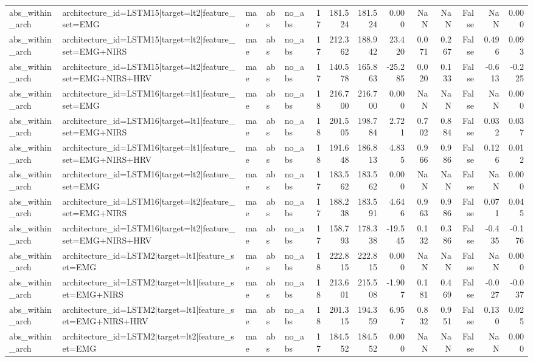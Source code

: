\begin{table}
\begin{tabular}{lllllrrrrrrrrr}
abs_within_arch & architecture_id=LSTM15|target=lt2|feature_set=EMG & mae & abs & no_abs & 17 & 181.524 & 181.524 & 0.000 & NaN & NaN & False & NaN & 0.000 \\
abs_within_arch & architecture_id=LSTM15|target=lt2|feature_set=EMG+NIRS & mae & abs & no_abs & 17 & 212.362 & 188.942 & 23.420 & 0.071 & 0.267 & False & 0.496 & 0.093 \\
abs_within_arch & architecture_id=LSTM15|target=lt2|feature_set=EMG+NIRS+HRV & mae & abs & no_abs & 17 & 140.578 & 165.863 & -25.285 & 0.020 & 0.133 & False & -0.613 & -0.225 \\
abs_within_arch & architecture_id=LSTM16|target=lt1|feature_set=EMG & mae & abs & no_abs & 18 & 216.700 & 216.700 & 0.000 & NaN & NaN & False & NaN & 0.000 \\
abs_within_arch & architecture_id=LSTM16|target=lt1|feature_set=EMG+NIRS & mae & abs & no_abs & 18 & 201.505 & 198.784 & 2.721 & 0.702 & 0.884 & False & 0.032 & 0.037 \\
abs_within_arch & architecture_id=LSTM16|target=lt1|feature_set=EMG+NIRS+HRV & mae & abs & no_abs & 18 & 191.648 & 186.813 & 4.835 & 0.966 & 0.986 & False & 0.126 & 0.012 \\
abs_within_arch & architecture_id=LSTM16|target=lt2|feature_set=EMG & mae & abs & no_abs & 17 & 183.562 & 183.562 & 0.000 & NaN & NaN & False & NaN & 0.000 \\
abs_within_arch & architecture_id=LSTM16|target=lt2|feature_set=EMG+NIRS & mae & abs & no_abs & 17 & 188.238 & 183.591 & 4.646 & 0.963 & 0.986 & False & 0.071 & 0.045 \\
abs_within_arch & architecture_id=LSTM16|target=lt2|feature_set=EMG+NIRS+HRV & mae & abs & no_abs & 17 & 158.793 & 178.338 & -19.545 & 0.132 & 0.386 & False & -0.435 & -0.176 \\
abs_within_arch & architecture_id=LSTM2|target=lt1|feature_set=EMG & mae & abs & no_abs & 18 & 222.815 & 222.815 & 0.000 & NaN & NaN & False & NaN & 0.000 \\
abs_within_arch & architecture_id=LSTM2|target=lt1|feature_set=EMG+NIRS & mae & abs & no_abs & 18 & 213.601 & 215.508 & -1.907 & 0.181 & 0.469 & False & -0.027 & -0.037 \\
abs_within_arch & architecture_id=LSTM2|target=lt1|feature_set=EMG+NIRS+HRV & mae & abs & no_abs & 18 & 201.315 & 194.359 & 6.957 & 0.832 & 0.951 & False & 0.130 & 0.025 \\
abs_within_arch & architecture_id=LSTM2|target=lt2|feature_set=EMG & mae & abs & no_abs & 17 & 184.552 & 184.552 & 0.000 & NaN & NaN & False & NaN & 0.000 \\

\end{tabular}
\end{table}
